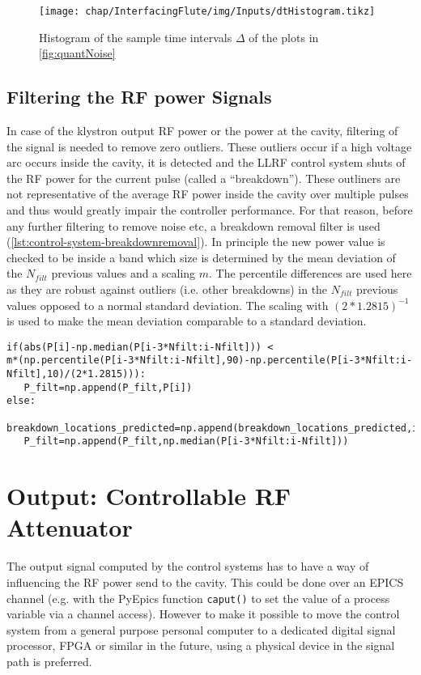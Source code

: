 \begin{figure}[tb]
\centering
\texttt{[image: chap/InterfacingFlute/img/Inputs/dtHistogram.tikz]}
\caption{Histogram of the sample time intervals $\Delta$ of the plots in \autoref{fig:quantNoise}}
\label{fig:interfacingFlute_sampleTimesHist}
\end{figure}

\subsection{Filtering the RF power Signals}
In case of the klystron output RF power or the power at the cavity, filtering of the signal is needed to remove zero outliers.
These outliers occur if a high voltage arc occurs inside the cavity, it is detected and the LLRF control system shuts of the RF power for the current pulse (called a ``breakdown'').
These outliners are not representative of the average RF power inside the cavity over multiple pulses and thus would greatly impair the controller performance.
For that reason, before any further filtering to remove noise etc, a breakdown removal filter is used (\autoref{lst:control-system-breakdownremoval}).
In principle the new power value is checked to be inside a band which size is determined by the mean deviation of the $N_{filt}$ previous values and a scaling $m$.
The percentile differences are used here as they are robust against outliers (i.e. other breakdowns) in the $N_{filt}$ previous values opposed to a normal standard deviation.
The scaling with $(2*1.2815)^{-1}$ is used to make the mean deviation comparable to a standard deviation.

\begin{lstlisting}[style=python,caption = Breakdown removal filtering, label = lst:control-system-breakdownremoval]
if(abs(P[i]-np.median(P[i-3*Nfilt:i-Nfilt])) <
m*(np.percentile(P[i-3*Nfilt:i-Nfilt],90)-np.percentile(P[i-3*Nfilt:i-Nfilt],10)/(2*1.2815))):
   P_filt=np.append(P_filt,P[i])
else:
   breakdown_locations_predicted=np.append(breakdown_locations_predicted,i)
   P_filt=np.append(P_filt,np.median(P[i-3*Nfilt:i-Nfilt]))
\end{lstlisting}





\section{Output: Controllable RF Attenuator}\label{sec:atteneval}
The output signal computed by the control systems has to have a way of influencing the RF power send to the cavity. This could be done over an EPICS channel (e.g. with the PyEpics function \texttt{caput()} to set the value of a process variable via a channel access). However to make it possible to move the control system from a general purpose personal computer to a dedicated digital signal processor, FPGA or similar in the future, using a physical device in the signal path is preferred.\\

